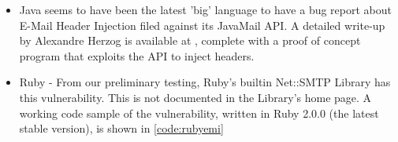 \begin{itemize}
	
	\item Java seems to have been the latest 'big' language to have a bug report about E-Mail Header Injection filed against its JavaMail API. A detailed write-up by Alexandre Herzog is available at \cite{Herzog.2014}, complete with a proof of concept program that exploits the API to inject headers.
	
	\item Ruby - From our preliminary testing, Ruby's builtin Net::SMTP Library has this vulnerability. This is not documented in the Library's home page.
	A working code sample of the vulnerability, written in Ruby 2.0.0 (the latest stable version), is shown in \ref{code:rubyemi}
	
	
	


\end{itemize}
 
